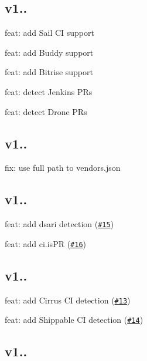\subsection*{v1..}


\begin{DoxyItemize}
\item feat\+: add Sail CI support
\item feat\+: add Buddy support
\item feat\+: add Bitrise support
\item feat\+: detect Jenkins P\+Rs
\item feat\+: detect Drone P\+Rs
\end{DoxyItemize}

\subsection*{v1..}


\begin{DoxyItemize}
\item fix\+: use full path to vendors.\+json
\end{DoxyItemize}

\subsection*{v1..}


\begin{DoxyItemize}
\item feat\+: add dsari detection (\href{https://github.com/watson/ci-info/pull/15}{\tt \#15})
\item feat\+: add ci.\+is\+PR (\href{https://github.com/watson/ci-info/pull/16}{\tt \#16})
\end{DoxyItemize}

\subsection*{v1..}


\begin{DoxyItemize}
\item feat\+: add Cirrus CI detection (\href{https://github.com/watson/ci-info/pull/13}{\tt \#13})
\item feat\+: add Shippable CI detection (\href{https://github.com/watson/ci-info/pull/14}{\tt \#14})
\end{DoxyItemize}

\subsection*{v1..}


